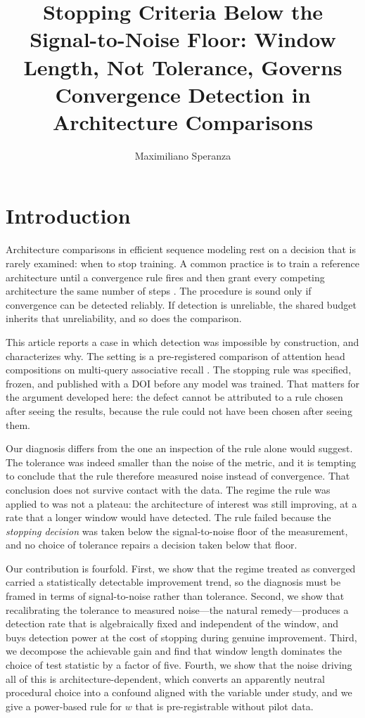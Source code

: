 \documentclass[jou,11pt,donotrepeattitle]{apa7}
\title{Stopping Criteria Below the Signal-to-Noise Floor: Window Length,
Not Tolerance, Governs Convergence Detection in Architecture Comparisons}
\author{Maximiliano Speranza}
\affiliation{Independent Researcher, Argentina}
\begin{document}
\maketitle

\section{Introduction}

Architecture comparisons in efficient sequence modeling rest on a decision that is rarely
examined: when to stop training. A common practice is to train a reference architecture until a
convergence rule fires and then grant every competing architecture the same number of steps
\parencite{li2019budgeted}. The procedure is sound only if convergence can be detected reliably.
If detection is unreliable, the shared budget inherits that unreliability, and so does the
comparison.

This article reports a case in which detection was impossible by construction, and characterizes
why. The setting is a pre-registered comparison of attention head compositions on multi-query
associative recall \parencite[MQAR;][]{arora2023zoology}. The stopping rule was specified,
frozen, and published with a DOI before any model was trained. That matters for the argument
developed here: the defect cannot be attributed to a rule chosen after seeing the results,
because the rule could not have been chosen after seeing them.

Our diagnosis differs from the one an inspection of the rule alone would suggest. The tolerance
was indeed smaller than the noise of the metric, and it is tempting to conclude that the rule
therefore measured noise instead of convergence. That conclusion does not survive contact with
the data. The regime the rule was applied to was not a plateau: the architecture of interest was
still improving, at a rate that a longer window would have detected. The rule failed because the
\emph{stopping decision} was taken below the signal-to-noise floor of the measurement, and no
choice of tolerance repairs a decision taken below that floor.

Our contribution is fourfold. First, we show that the regime treated as converged carried a
statistically detectable improvement trend, so the diagnosis must be framed in terms of
signal-to-noise rather than tolerance. Second, we show that recalibrating the tolerance to
measured noise---the natural remedy---produces a detection rate that is algebraically fixed and
independent of the window, and buys detection power at the cost of stopping during genuine
improvement. Third, we decompose the achievable gain and find that window length dominates the
choice of test statistic by a factor of five. Fourth, we show that the noise driving all of this
is architecture-dependent, which converts an apparently neutral procedural choice into a
confound aligned with the variable under study, and we give a power-based rule for $w$ that is
pre-registrable without pilot data.
\end{document}
